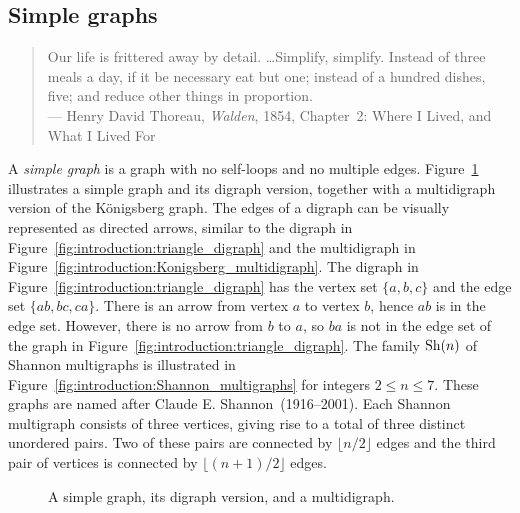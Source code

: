 
\subsection{Simple graphs}

\begin{quote}
\footnotesize
Our life is frittered away by detail. \dots Simplify,
simplify. Instead of three meals a day, if it be necessary eat but
one; instead of a hundred dishes, five; and reduce other things in
proportion. \\
\noindent
--- Henry David Thoreau, \emph{Walden},
1854, Chapter~2: Where I Lived, and What I Lived For
\end{quote}

\noindent
A \emph{simple graph} is a
graph with no self-loops and no multiple edges.
Figure~\ref{fig:introduction:simple_graph_digraph_multidigraph}
illustrates a simple graph and its digraph version, together with a
multidigraph version of the K\"onigsberg graph. The edges of a digraph
can be visually represented as directed arrows, similar to the digraph
in Figure~\ref{fig:introduction:triangle_digraph} and the multidigraph
in Figure~\ref{fig:introduction:Konigsberg_multidigraph}. The digraph
in Figure~\ref{fig:introduction:triangle_digraph} has the vertex set
$\{a, b, c\}$ and the edge set $\{ab, bc, ca\}$. There is an arrow
from vertex $a$ to vertex $b$, hence $ab$ is in the edge set. However,
there is no arrow from $b$ to $a$, so $ba$ is not in the edge set of
the graph in Figure~\ref{fig:introduction:triangle_digraph}. The
family $\operatorname*{Sh}(n)$ of Shannon multigraphs is
illustrated in Figure~\ref{fig:introduction:Shannon_multigraphs} for
integers $2 \leq n \leq 7$. These graphs are named after
Claude E. Shannon~(1916--2001). Each Shannon
multigraph consists of three vertices, giving rise to a total of three
distinct unordered pairs. Two of these pairs are connected by
$\lfloor n/2 \rfloor$ edges and the third pair of vertices is
connected by $\lfloor (n + 1) / 2 \rfloor$ edges.

\begin{figure}[!htbp]
\centering

\caption{A simple graph, its digraph version, and a multidigraph.}
\label{fig:introduction:simple_graph_digraph_multidigraph}
\end{figure}

